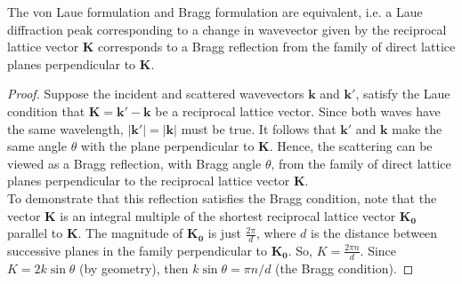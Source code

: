 \documentclass[a4paper]{article}
\begin{document}
\begin{thm}
The von Laue formulation and Bragg formulation are equivalent, i.e. a Laue diffraction peak corresponding to a change in wavevector given by the reciprocal lattice vector $\mathbf{K}$ corresponds to a Bragg reflection from the family of direct lattice planes perpendicular to $\mathbf{K}$.
\end{thm}
\begin{proof}
Suppose the incident and scattered wavevectors $\mathbf{k}$ and $\mathbf{k'}$, satisfy the Laue condition that $\mathbf{K}=\mathbf{k'}-\mathbf{k}$ be a reciprocal lattice vector. Since both waves have the same wavelength, $|\mathbf{k'}|=|\mathbf{k}|$ must be true. It follows that $\mathbf{k'}$ and $\mathbf{k}$ make the same angle $\theta$ with the plane perpendicular to $\mathbf{K}$. Hence, the scattering can be viewed as a Bragg reflection, with Bragg angle $\theta$, from the family of direct lattice planes perpendicular to the reciprocal lattice vector $\mathbf{K}$.\\[5pt]
To demonstrate that this reflection satisfies the Bragg condition, note that the vector $\mathbf{K}$ is an integral multiple of the shortest reciprocal lattice vector $\mathbf{K_0}$ parallel to $\mathbf{K}$. The magnitude of $\mathbf{K_0}$ is just $\frac{2\pi}{d}$, where $d$ is the distance between successive planes in the family perpendicular to $\mathbf{K_0}$. So, $K=\frac{2\pi n}{d}$. Since $K=2k\sin\theta$ (by geometry), then $k\sin\theta=\pi n/d$ (the Bragg condition).
\end{proof}
\end{document}
